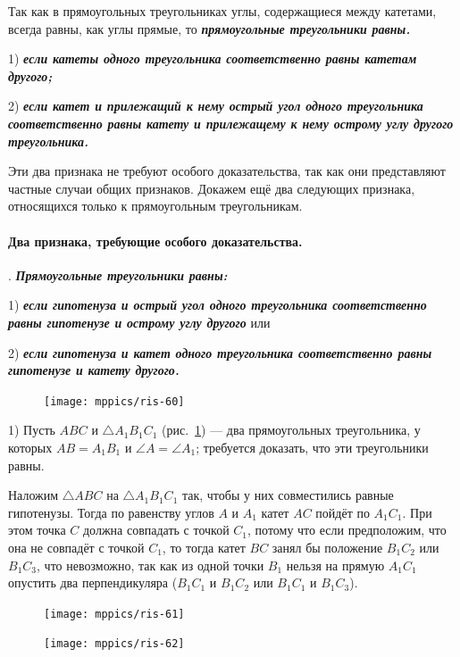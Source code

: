 \documentclass[oneside]{book}
\begin{document}
Так как в прямоугольных треугольниках углы, содержащиеся между катетами, всегда равны, как углы прямые, то \textbf{\emph{прямоугольные треугольники равны.}}

1) \textbf{\emph{если катеты одного треугольника соответственно равны катетам другого;}}

2) \textbf{\emph{если катет и прилежащий к нему острый угол одного треугольника соответственно равны катету и прилежащему к нему острому углу другого треугольника.}}

Эти два признака не требуют особого доказательства, так как они представляют частные случаи общих признаков.
Докажем ещё два следующих признака, относящихся только к прямоугольным треугольникам.

\paragraph{Два признака, требующие особого доказательства.}\label{1938/57}
.
\textbf{\emph{Прямоугольные треугольники равны:}}

1) \textbf{\emph{если гипотенуза и острый угол одного треугольника соответственно равны гипотенузе и острому углу другого}} или

2) \textbf{\emph{если гипотенуза и катет одного треугольника соответственно равны гипотенузе и катету другого.}}

\begin{figure}[h!]
\centering
\texttt{[image: mppics/ris-60]}
\caption{}\label{1938/ris-60}
\end{figure}

1) Пусть $ABC$ и $\triangle A_1B_1C_1$ (рис.~\ref{1938/ris-60}) — два прямоугольных треугольника, у которых $AB=A_1B_1$ и $\angle A = \angle A_1$;
требуется доказать, что эти треугольники равны.

Наложим $\triangle ABC$ на $\triangle A_1B_1C_1$ так, чтобы у них совместились равные гипотенузы.
Тогда по равенству углов $A$ и $A_1$ катет $AC$ пойдёт по $A_1C_1$.
При этом точка $C$ должна совпадать с точкой $C_1$, потому что если предположим, что она не совпадёт с точкой $C_1$, то тогда катет $BC$ занял бы положение $B_1C_2$ или $B_1C_3$, что невозможно, так как из одной точки $B_1$ нельзя на прямую $A_1C_1$ опустить два перпендикуляра ($B_1C_1$ и $B_1C_2$ или $B_1C_1$ и $B_1C_3$).

\begin{figure}[h!]
\begin{minipage}{.48\textwidth}
\centering
\texttt{[image: mppics/ris-61]}
\caption{}\label{1938/ris-61}
\end{minipage}\hfill
\begin{minipage}{.48\textwidth}
\centering
\texttt{[image: mppics/ris-62]}
\caption{}\label{1938/ris-62}
\end{minipage}
\end{figure}
\end{document}
